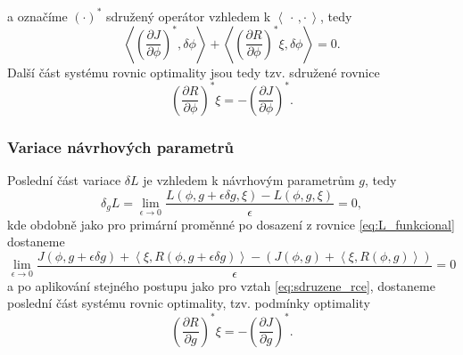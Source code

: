 a označíme $ (\cdot)^* $ sdružený operátor vzhledem k $  \left\langle \, \cdot\,,\cdot \,  \right\rangle $, tedy
\begin{equation}
\left\langle   \left(\frac{\partial J}{\partial \phi}\right)^* ,\delta\phi  \right\rangle
+  \left\langle \left(\dfrac{\partial R}{\partial \phi}\right)^* \xi ,  \delta\phi\right\rangle
=0.
\end{equation}
Další část systému rovnic optimality jsou tedy tzv. sdružené rovnice \cite{karman1997inverse}
\begin{equation}\label{eq:sdruzene_rce}
\left( \dfrac{\partial R}{\partial \phi} \right)^* \xi = 
- \left(\dfrac{\partial J}{\partial \phi}\right)^*.
\end{equation}

\subsubsection{Variace návrhových parametrů}

Poslední část variace $ \delta L $ je vzhledem k návrhovým parametrům $ g $, tedy
\begin{equation}
\delta_g L =
\lim\limits_{\epsilon\rightarrow 0}
\dfrac{L(\phi,g+\epsilon\delta g,\xi)-L(\phi,g,\xi)}
{\epsilon}
=0,
\end{equation}
kde obdobně jako pro primární proměnné po dosazení z rovnice \ref{eq:L_funkcional} dostaneme
\begin{equation}
\lim\limits_{\epsilon\rightarrow0} \dfrac
{J(\phi, g+\epsilon\delta g) + 
	 \left\langle\xi , R(\phi, g+\epsilon\delta g)\right\rangle  -  (J(\phi, g) +  \left\langle\xi , R(\phi, g)\right\rangle)}
{\epsilon}
=0
\end{equation}
a po aplikování stejného postupu jako pro vztah \ref{eq:sdruzene_rce}, dostaneme poslední část systému rovnic optimality, tzv. podmínky optimality \cite{karman1997inverse}
\begin{equation}\label{eq:podminky_optimalnosti}
\left( \dfrac{\partial R}{\partial g} \right)^* \xi = 
- \left(\dfrac{\partial J}{\partial g}\right)^*.
\end{equation}

